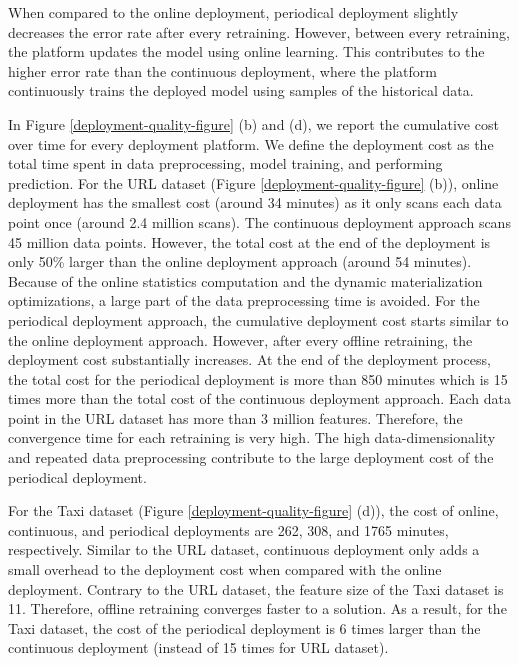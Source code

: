 When compared to the online deployment, periodical deployment slightly decreases the error rate after every retraining.
However, between every retraining, the platform updates the model using online learning.
This contributes to the higher error rate than the continuous deployment, where the platform continuously trains the deployed model using samples of the historical data.

In Figure \ref{deployment-quality-figure} (b) and (d), we report the cumulative cost over time for every deployment platform.
We define the deployment cost as the total time spent in data preprocessing, model training, and performing prediction.
For the URL dataset (Figure \ref{deployment-quality-figure} (b)), online deployment has the smallest cost (around 34 minutes) as it only scans each data point once (around 2.4 million scans).  
The continuous deployment approach scans 45 million data points.
However, the total cost at the end of the deployment is only 50\% larger than the online deployment approach (around 54 minutes).  
Because of the online statistics computation and the dynamic materialization optimizations, a large part of the data preprocessing time is avoided.
For the periodical deployment approach, the cumulative deployment cost starts similar to the online deployment approach.
However, after every offline retraining, the deployment cost substantially increases.
At the end of the deployment process, the total cost for the periodical deployment is more than 850 minutes which is 15 times more than the total cost of the continuous deployment approach.
Each data point in the URL dataset has more than 3 million features.
Therefore, the convergence time for each retraining is very high.
The high data-dimensionality and repeated data preprocessing contribute to the large deployment cost of the periodical deployment.

For the Taxi dataset (Figure \ref{deployment-quality-figure} (d)), the cost of online, continuous, and periodical deployments are 262, 308, and 1765 minutes, respectively.
Similar to the URL dataset, continuous deployment only adds a small overhead to the deployment cost when compared with the online deployment.
Contrary to the URL dataset, the feature size of the Taxi dataset is 11.
Therefore, offline retraining converges faster to a solution.
As a result, for the Taxi dataset, the cost of the periodical deployment is 6 times larger than the continuous deployment (instead of 15 times for URL dataset). 


